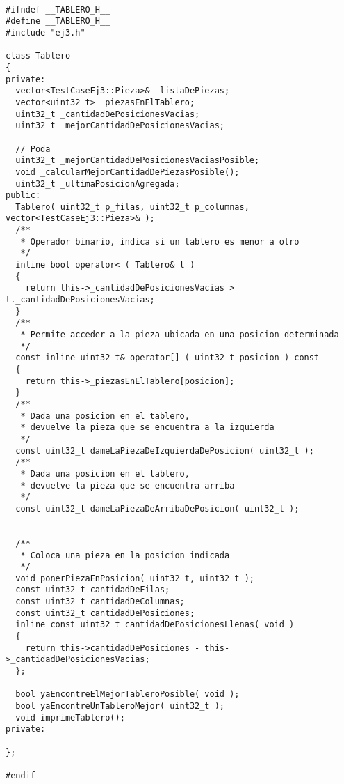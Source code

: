 \documentclass[11pt, a4paper, twoside]{article}
\begin{document}
\begin{lstlisting}

#ifndef __TABLERO_H__
#define __TABLERO_H__
#include "ej3.h"

class Tablero
{
private:
  vector<TestCaseEj3::Pieza>& _listaDePiezas;
  vector<uint32_t> _piezasEnElTablero;
  uint32_t _cantidadDePosicionesVacias;
  uint32_t _mejorCantidadDePosicionesVacias;

  // Poda
  uint32_t _mejorCantidadDePosicionesVaciasPosible;
  void _calcularMejorCantidadDePiezasPosible();
  uint32_t _ultimaPosicionAgregada;
public:
  Tablero( uint32_t p_filas, uint32_t p_columnas, vector<TestCaseEj3::Pieza>& );
  /**
   * Operador binario, indica si un tablero es menor a otro
   */
  inline bool operator< ( Tablero& t )
  {
    return this->_cantidadDePosicionesVacias > t._cantidadDePosicionesVacias;
  }
  /**
   * Permite acceder a la pieza ubicada en una posicion determinada
   */
  const inline uint32_t& operator[] ( uint32_t posicion ) const
  {
    return this->_piezasEnElTablero[posicion];
  }
  /**
   * Dada una posicion en el tablero,
   * devuelve la pieza que se encuentra a la izquierda
   */
  const uint32_t dameLaPiezaDeIzquierdaDePosicion( uint32_t );
  /**
   * Dada una posicion en el tablero,
   * devuelve la pieza que se encuentra arriba
   */
  const uint32_t dameLaPiezaDeArribaDePosicion( uint32_t );

 
  /**
   * Coloca una pieza en la posicion indicada
   */
  void ponerPiezaEnPosicion( uint32_t, uint32_t );
  const uint32_t cantidadDeFilas;
  const uint32_t cantidadDeColumnas;
  const uint32_t cantidadDePosiciones;
  inline const uint32_t cantidadDePosicionesLlenas( void )
  {
    return this->cantidadDePosiciones - this->_cantidadDePosicionesVacias;
  };

  bool yaEncontreElMejorTableroPosible( void );
  bool yaEncontreUnTableroMejor( uint32_t );
  void imprimeTablero();
private:

};

#endif

\end{lstlisting}
\clearpage
\end{document}
